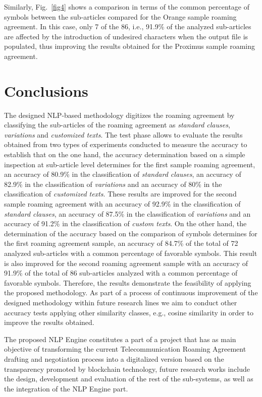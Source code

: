 \documentclass[conference]{style/IEEEtran}
\begin{document}
Similarly, Fig.~\ref{fig4} shows a comparison in terms of the common percentage of symbols between the sub-articles compared for the Orange sample roaming agreement. In this case, only 7 of the 86, i.e., 91.9\% of the analyzed sub-articles are affected by the introduction of undesired characters when the output file is populated, thus improving the results obtained for the Proximus sample roaming agreement.

\section{Conclusions}
The designed NLP-based methodology digitizes the roaming agreement by classifying the sub-articles of the roaming agreement as \textit{standard clauses}, \textit{variations} and \textit{customized texts}. The test phase allows to evaluate the results obtained from two types of experiments conducted to measure the accuracy to establish that on the one hand, the accuracy  determination  based  on  a  simple  inspection  at sub-article level determines for the first sample roaming agreement, an accuracy of 80.9\% in the classification of \textit{standard clauses}, an accuracy of 82.9\% in the classification of \textit{variations} and an accuracy of 80\% in the classification of \textit{customized texts}. These results are improved for the second sample roaming agreement with an accuracy of 92.9\% in the classification of \textit{standard clauses}, an accuracy of 87.5\% in the classification of \textit{variations} and an accuracy of 91.2\% in the classification of \textit{custom texts}. On the other hand, the determination of the accuracy based on the comparison of symbols determines for the first roaming agreement sample, an accuracy of 84.7\% of the total of 72 analyzed sub-articles with a common percentage of favorable symbols. This result is also improved for the second roaming agreement sample with an accuracy of 91.9\% of the total of 86 sub-articles analyzed with a common percentage of favorable symbols. Therefore, the results demonstrate the feasibility of applying the proposed methodology. As part of a process of continuous improvement of the designed methodology within future research lines we aim to conduct other accuracy tests applying other similarity classes, e.g., cosine similarity in order to improve the results obtained.

The proposed NLP Engine constitutes a part of a project that has as main objective of transforming the current Telecommunication Roaming Agreement drafting and negotiation process into a digitalized version based on the transparency promoted by blockchain technology, future research works include the design, development and evaluation of the rest of the sub-systems, as well as the integration of the NLP Engine part.

\printbibliography

\vspace{12pt}
\end{document}
